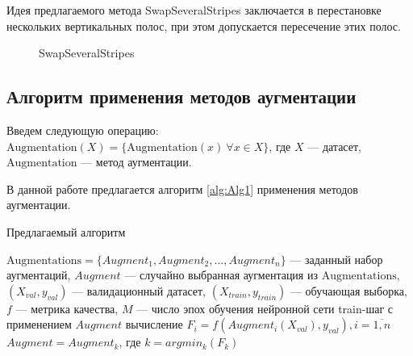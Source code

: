\documentclass[12pt, fleqn]{article}
\begin{document}
\begin{enumerate}
\begin{enumerate}
    	\end{enumerate}
    	Идея предлагаемого метода SwapSeveralStripes заключается в перестановке нескольких вертикальных полос, при этом допускается пересечение этих полос.
    	\begin{figure}[ht!]
    	\caption{SwapSeveralStripes}
    	\label{fig:i2}
        \end{figure}
\end{enumerate}

\newpage
\subsection{Алгоритм применения методов аугментации}

Введем следующую операцию: \newline
$\text{Augmentation}(X) = \{\text{Augmentation}(x) \ \forall x \in X\}$, где $X$ --- датасет, \newline $\text{Augmentation}$ --- метод аугментации.

В данной работе предлагается алгоритм \ref{alg:Alg1} применения методов аугментации.

\algrenewcommand{}
\algrenewcommand{}

\begin{algorithm}
\caption{Предлагаемый алгоритм}\label{alg:Alg1}
\begin{algorithmic}
\State $\text{Augmentations} = \{Augment_1, Augment_2, ..., Augment_n\}$ --- заданный набор аугментаций,
\State $Augment$ --- случайно выбранная аугментация  из $\text{Augmentations}$,
\State $(X_{val}, y_{val})$ --- валидационный датасет, 
\State $(X_{train}, y_{train})$ --- обучающая выборка,
\State $f$ --- метрика качества,
\State $M$ --- число эпох обучения нейронной сети
\State train-шаг с применением $Augment$
\State вычисление $F_i = f(Augment_i(X_{val}), y_{val}), i = \overline{1,n}$
\State $Augment = Augment_k$, где $k = argmin_k(F_k)$
\EndFor
\end{algorithmic}
\end{algorithm}
\end{document}

